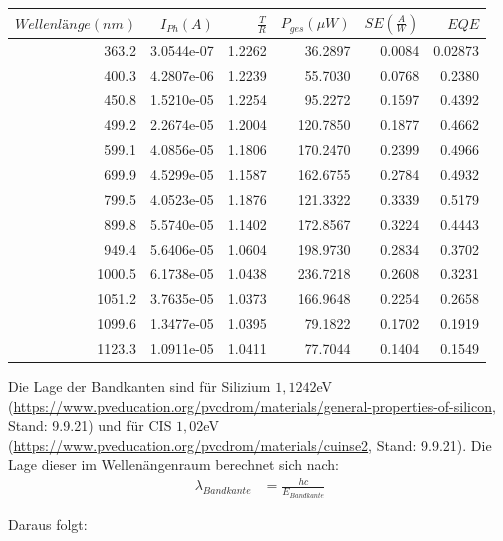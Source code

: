 \begin{center}
\begin{tabular}{rrrrrr}
    $Wellenlänge (nm)$ &  $I_{Ph} (A)$ &    $\frac{T}{R}$ &  $P_{ges} (\mu W)$ &  $SE (\frac{A}{W})$ &       $EQE$ \\
    \hline
    363.2 &  3.0544e-07 &  1.2262 &    36.2897 &  0.0084 &  0.02873 \\
    400.3 &  4.2807e-06 &  1.2239 &    55.7030 &  0.0768 &   0.2380 \\
    450.8 &  1.5210e-05 &  1.2254 &    95.2272 &  0.1597 &   0.4392 \\
    499.2 &  2.2674e-05 &  1.2004 &   120.7850 &  0.1877 &   0.4662 \\
    599.1 &  4.0856e-05 &  1.1806 &   170.2470 &  0.2399 &   0.4966 \\
    699.9 &  4.5299e-05 &  1.1587 &   162.6755 &  0.2784 &   0.4932 \\
    799.5 &  4.0523e-05 &  1.1876 &   121.3322 &  0.3339 &    0.5179 \\
    899.8 &  5.5740e-05 &  1.1402 &   172.8567 &  0.3224 &   0.4443 \\
    949.4 &  5.6406e-05 &  1.0604 &   198.9730 &  0.2834 &   0.3702 \\
    1000.5 &  6.1738e-05 &  1.0438 &   236.7218 &  0.2608 &   0.3231 \\
    1051.2 &  3.7635e-05 &  1.0373 &   166.9648 &  0.2254 &   0.2658 \\
    1099.6 &  1.3477e-05 &  1.0395 &    79.1822 &  0.1702 &   0.1919 \\
    1123.3 &  1.0911e-05 &  1.0411 &    77.7044 &  0.1404 &   0.1549 \\
\end{tabular}
\label{tab:32cis}
\end{center}

Die Lage der Bandkanten sind für Silizium $1,1242$eV 
(\url{https://www.pveducation.org/pvcdrom/materials/general-properties-of-silicon}, Stand: 9.9.21) und für CIS $1,02$eV 
(\url{https://www.pveducation.org/pvcdrom/materials/cuinse2}, Stand: 9.9.21). Die Lage dieser im Wellenängenraum berechnet sich nach: \\

\begin{align}
\lambda_{Bandkante} &= \frac{hc}{E_{Bandkante}}
\end{align}

Daraus folgt: \\

